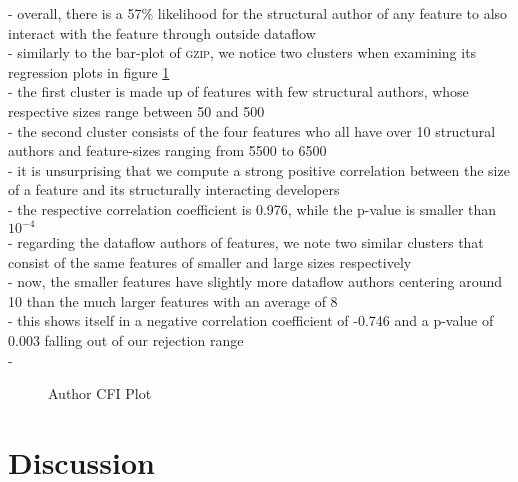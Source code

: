 - overall, there is a 57\% likelihood for the structural author of any feature to also interact with the feature through outside dataflow \\
- similarly to the bar-plot of \textsc{gzip}, we notice two clusters when examining its regression plots in figure \ref{fig:author_cfi_plot} \\
- the first cluster is made up of features with few structural authors, whose respective sizes range between 50 and 500 \\
- the second cluster consists of the four features who all have over 10 structural authors and feature-sizes ranging from 5500 to 6500 \\
- it is unsurprising that we compute a strong positive correlation between the size of a feature and its structurally interacting developers \\
- the respective correlation coefficient is 0.976, while the p-value is smaller than $10^{-4}$ \\
- regarding the dataflow authors of features, we note two similar clusters that consist of the same features of smaller and large sizes respectively \\
- now, the smaller features have slightly more dataflow authors centering around 10 than the much larger features with an average of 8 \\
- this shows itself in a negative correlation coefficient of -0.746 and a p-value of 0.003 falling out of our rejection range \\
- 
































\begin{figure}[htbp]
  \centering
  
  \caption{Author CFI Plot}
  \label{fig:author_cfi_plot}
\end{figure}

\clearpage 

\section{Discussion}\label{sec:discussion}

